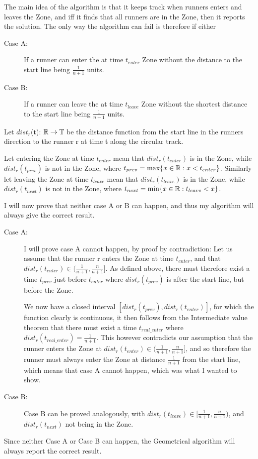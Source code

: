 \begin{theo}[Correctness:]
The main idea of the algorithm is that it keeps track when runners enters and leaves the Zone, and iff it finds that all runners are in the Zone, then it reports the solution. The only way the algorithm can fail is therefore if either

\begin{description}
\item[Case A:] If a runner can enter the at time $t_{enter}$ Zone without the distance to the start line being $\frac{1}{n+1}$ units. 
\item[Case B:] If a runner can leave the at time $t_{leave}$ Zone without the shortest distance to the start line being $\frac{1}{n+1}$ units.  
\end{description}
Let $dist_r$(t): $\mathbb{R} \rightarrow \mathbb{T}$ be the distance function from the start line in the runners direction to the runner r at time t along the circular track.

Let entering the Zone at time $t_{enter}$ mean that $dist_r(t_{enter})$ is in the Zone, while $dist_r(t_{prev})$ is not in the Zone, where $t_{prev} = \max\{x \in \mathbb{R}: x < t_{enter}\}$. Similarly let leaving the Zone at time $t_{leave}$ mean that $dist_r(t_{leave})$ is in the Zone, while $dist_r(t_{next})$ is not in the Zone, where $t_{next} = \min\{x \in \mathbb{R}: t_{leave} < x\}$.
 
I will now prove that neither case A or B can happen, and thus my algorithm will always give the correct result.

\begin{description}
\item[Case A:]I will prove case A cannot happen, by proof by contradiction:
Let us assume that the runner r enters the Zone at time $t_{enter}$, and that $dist_r(t_{enter}) \in (\frac{1}{n+1}, \frac{n}{n+1}]$. As defined above, there must therefore exist a time $t_{prev}$ just before $t_{enter}$ where $dist_r(t_{prev})$ is after the start line, but before the Zone. 

We now have a closed interval $[dist_r(t_{prev}), dist_r(t_{enter})]$, for which the function clearly is continuous, it then follows from the Intermediate value theorem that there must exist a time $t_{real\_enter}$ where $dist_r(t_{real\_enter}) = \frac{1}{n+1}$. This however contradicts our assumption that the runner enters the Zone at $dist_r(t_{enter}) \in (\frac{1}{n+1}, \frac{n}{n+1}]$, and so therefore the runner must always enter the Zone at distance $\frac{1}{n+1}$ from the start line, which means that case A cannot happen, which was what I wanted to show.
\item[Case B:]Case B can be proved analogously, with $dist_r(t_{leave}) \in [\frac{1}{n+1}, \frac{n}{n+1})$, and $dist_r(t_{next})$ not being in the Zone.
\end{description}
Since neither Case A or Case B can happen, the Geometrical algorithm will always report the correct result.
\end{theo}

